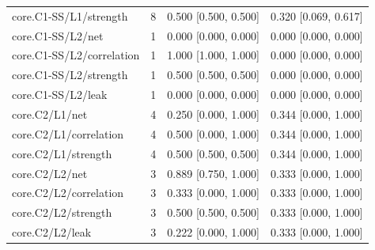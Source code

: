 \begin{longtable}{@{}p{1.9in}rl l@{}}
core.\allowbreak C1-SS/\allowbreak L1/\allowbreak strength & 8 & 0.500 [0.500, 0.500] & 0.320 [0.069, 0.617]\\
core.\allowbreak C1-SS/\allowbreak L2/\allowbreak net & 1 & 0.000 [0.000, 0.000] & 0.000 [0.000, 0.000]\\
core.\allowbreak C1-SS/\allowbreak L2/\allowbreak correlation & 1 & 1.000 [1.000, 1.000] & 0.000 [0.000, 0.000]\\
core.\allowbreak C1-SS/\allowbreak L2/\allowbreak strength & 1 & 0.500 [0.500, 0.500] & 0.000 [0.000, 0.000]\\
core.\allowbreak C1-SS/\allowbreak L2/\allowbreak leak & 1 & 0.000 [0.000, 0.000] & 0.000 [0.000, 0.000]\\
core.\allowbreak C2/\allowbreak L1/\allowbreak net & 4 & 0.250 [0.000, 1.000] & 0.344 [0.000, 1.000]\\
core.\allowbreak C2/\allowbreak L1/\allowbreak correlation & 4 & 0.500 [0.000, 1.000] & 0.344 [0.000, 1.000]\\
core.\allowbreak C2/\allowbreak L1/\allowbreak strength & 4 & 0.500 [0.500, 0.500] & 0.344 [0.000, 1.000]\\
core.\allowbreak C2/\allowbreak L2/\allowbreak net & 3 & 0.889 [0.750, 1.000] & 0.333 [0.000, 1.000]\\
core.\allowbreak C2/\allowbreak L2/\allowbreak correlation & 3 & 0.333 [0.000, 1.000] & 0.333 [0.000, 1.000]\\
core.\allowbreak C2/\allowbreak L2/\allowbreak strength & 3 & 0.500 [0.500, 0.500] & 0.333 [0.000, 1.000]\\
core.\allowbreak C2/\allowbreak L2/\allowbreak leak & 3 & 0.222 [0.000, 1.000] & 0.333 [0.000, 1.000]\\

\end{longtable}
